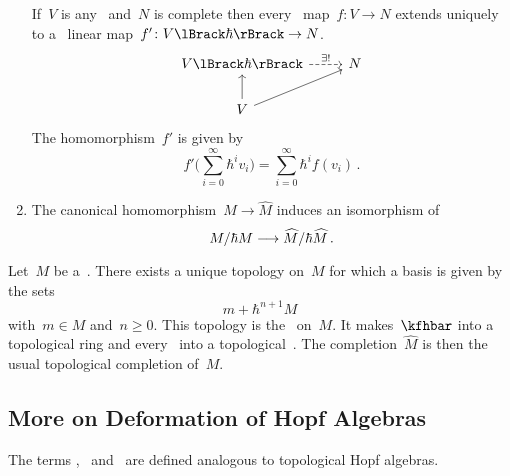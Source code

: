 \documentclass[a4paper, 11pt, oneside]{scrartcl}
\begin{document}
\begin{proposition}
\begin{enumerate}
      If~$V$ is any~\vectorspace{$\kf$} and~$N$ is complete then every~\linear{$\kf$} map~$f \colon V \to N$ extends uniquely to a~\linear{$\kfhbar$} linear map~$f' \colon \power{V}{\hbar} \to N$.
      \[
        \begin{tikzcd}
          \power{V}{\hbar}
          \arrow[dashed]{r}[above]{\exists!}
          &
          N
          \\
          V
          \arrow{u}
          \arrow{ur}
          &
          {}
        \end{tikzcd}
      \]
      The homomorphism~$f'$ is given by
      \[
        f'\Biggl( \sum_{i=0}^\infty \hbar^i v_i \Biggr)
        =
        \sum_{i=0}^\infty \hbar^i f(v_i) \,.
      \]
    \item
      The canonical homomorphism~$M \to \widehat{M}$ induces an isomorphism of~\vectorspaces{$\kf$}
      \[
        M / \hbar M
        \longrightarrow
        \widehat{M} / \hbar \widehat{M} \,.
      \]
  \end{enumerate}
\end{proposition}


\begin{remark}
  Let~$M$ be a~\module{$\kfhbar$}.
  There exists a unique topology on~$M$ for which a basis is given by the sets
  \[
    m + \hbar^{n+1} M
  \]
  with~$m \in M$ and~$n \geq 0$.
  This topology is the~ on~$M$.
  It makes~$\kfhbar$ into a topological ring and every~\module{$\kfhbar$} into a topological~\module{$\kfhbar$}.
  The completion~$\widehat{M}$ is then the usual topological completion of~$M$.
\end{remark}



\subsection{More on Deformation of Hopf Algebras}

\begin{definition}
  \label{analogous topological definitions}
  The terms ,~ and~ are defined analogous to topological Hopf algebras.
\end{definition}
\end{document}

